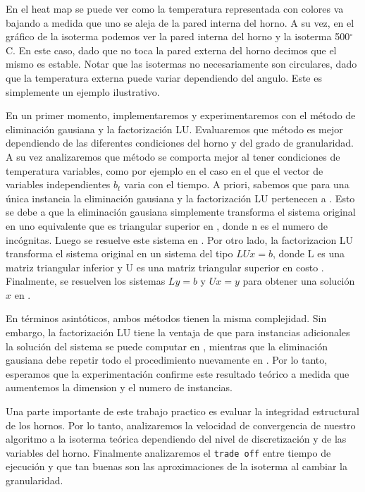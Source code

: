 En el heat map se puede ver como la temperatura representada con colores va bajando a medida que uno se aleja de la pared interna del horno. A su vez, en el gráfico de la isoterma podemos ver la pared interna del horno y la isoterma 500$^{\circ}$C. En este caso, dado que no toca la pared externa del horno decimos que el mismo es estable. Notar que las isotermas no necesariamente son circulares, dado que la temperatura externa puede variar dependiendo del angulo. Este es simplemente un ejemplo ilustrativo.

En un primer momento, implementaremos y experimentaremos con el método de eliminación gausiana y la factorización LU. Evaluaremos que método es mejor dependiendo de las diferentes condiciones del horno y del grado de granularidad. A su vez analizaremos que método se comporta mejor al tener condiciones de temperatura variables, como por ejemplo en el caso en el que el vector de variables independientes $b_t$ varia con el tiempo. A priori, sabemos que para una única instancia la eliminación gausiana y la factorización LU pertenecen a . Esto se debe a que la eliminación gausiana simplemente transforma el sistema original en uno equivalente que es triangular superior en , donde n es el numero de incógnitas. Luego se resuelve este sistema en . Por otro lado, la factorizacion LU transforma el sistema original en un sistema del tipo $LUx = b$, donde L es una matriz triangular inferior y U es una matriz triangular superior en costo . Finalmente, se resuelven los sistemas $Ly = b$ y $Ux = y$ para obtener una solución $x$ en .

En términos asintóticos, ambos métodos tienen la misma complejidad. Sin embargo, la factorización LU tiene la ventaja de que para instancias adicionales la solución del sistema se puede computar en , mientras que la eliminación gausiana debe repetir todo el procedimiento nuevamente en . Por lo tanto, esperamos que la experimentación confirme este resultado teórico a medida que aumentemos la dimension y el numero de instancias.

Una parte importante de este trabajo practico es evaluar la integridad estructural de los hornos. Por lo tanto, analizaremos la velocidad de convergencia de nuestro algoritmo a la isoterma teórica dependiendo del nivel de discretización y de las variables del horno. Finalmente analizaremos el \texttt{trade off} entre tiempo de ejecución y que tan buenas son las aproximaciones de la isoterma al cambiar la granularidad.
